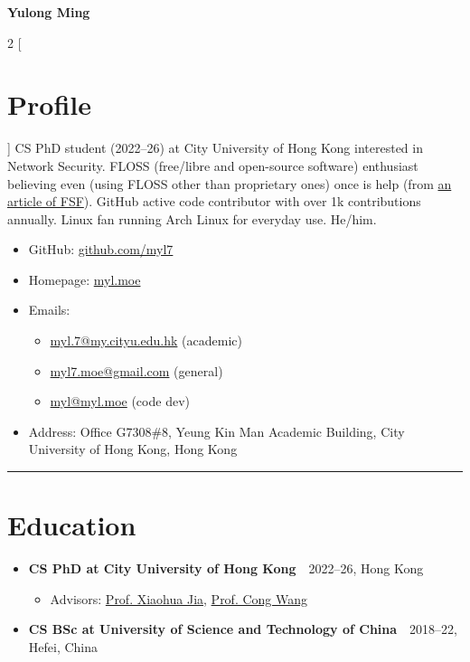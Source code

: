 \documentclass{article}
\begin{document}
\begin{center}
  {\huge \textbf{Yulong Ming}}
\end{center}

\begin{multicols}{2}
  [\section*{Profile}]
  CS PhD student (2022--26) at City University of Hong Kong interested in Network Security.
  FLOSS (free/libre and open-source software) enthusiast believing even (using FLOSS other than proprietary ones) once is help (from \href{https://www.gnu.org/philosophy/saying-no-even-once.html}{an article of FSF}).
  GitHub active code contributor with over 1k contributions annually.
  Linux fan running Arch Linux for everyday use.
  He/him.

  \begin{itemize}[itemsep=0cm,parsep=0cm]
    \item GitHub: \href{https://github.com/myl7}{github.com/myl7}
    \item Homepage: \href{https://myl.moe}{myl.moe}
    \item Emails:
    \begin{itemize}[itemsep=0cm,parsep=0cm,topsep=0cm,leftmargin=0.25cm,label=]
      \item \href{mailto:myl.7@my.cityu.edu.hk}{myl.7@my.cityu.edu.hk} (academic)
      \item \href{mailto:myl7.moe@gmail.com}{myl7.moe@gmail.com} (general)
      \item \href{mailto:myl@myl.moe}{myl@myl.moe} (code dev)
    \end{itemize}
    \item Address: Office G7308\#8, Yeung Kin Man Academic Building, City University of Hong Kong, Hong Kong
  \end{itemize}
\end{multicols}

\hrule

\section*{Education}
\begin{itemize}[parsep=0.1cm,leftmargin=0.4cm]
  \item \textbf{CS PhD at City University of Hong Kong}\ \dotfill\ 2022--26, Hong Kong
  \begin{itemize}[itemsep=0cm,parsep=0cm,topsep=0cm,leftmargin=0.25cm,label=]
    \item Advisors: \href{https://www.cs.cityu.edu.hk/~jia/}{Prof. Xiaohua Jia}, \href{https://www.cs.cityu.edu.hk/~congwang/}{Prof. Cong Wang}
  \end{itemize}
  \item \textbf{CS BSc at University of Science and Technology of China}\ \dotfill\ 2018--22, Hefei, China
\end{itemize}
\end{document}

